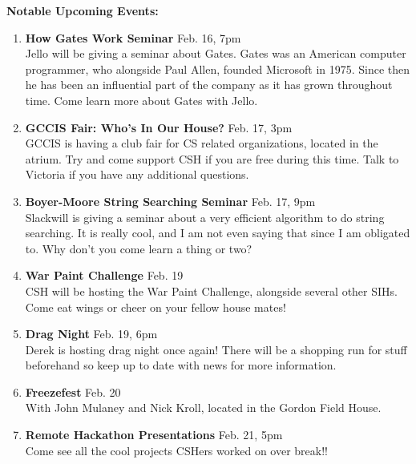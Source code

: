 \documentclass[9pt]{extarticle} %
\begin{document}
\begin{minipage}[t]{.44\linewidth}
\begin{mdframed}[style=sidebar,frametitle={}]
\textbf{Notable Upcoming Events:}
\begin{enumerate}[leftmargin=0.2cm]
\item \textbf{How Gates Work Seminar} Feb. 16, 7pm \\
	Jello will be giving a seminar about Gates. Gates was an American computer programmer, who alongside Paul Allen, founded Microsoft in 1975. Since then he has been an influential part of the company as it has grown throughout time. Come learn more about Gates with Jello.
\\
\item \textbf{GCCIS Fair: Who's In Our House?} Feb. 17, 3pm \\
	GCCIS is having a club fair for CS related organizations, located in the atrium. Try and come support CSH if you are free during this time. Talk to Victoria if you have any additional questions.
\\
\item \textbf{Boyer-Moore String Searching Seminar} Feb. 17, 9pm \\
	Slackwill is giving a seminar about a very efficient algorithm to do string searching. It is really cool, and I am not even saying that since I am obligated to. Why don't you come learn a thing or two?
\\
\item \textbf{War Paint Challenge} Feb. 19 \\
	CSH will be hosting the War Paint Challenge, alongside several other SIHs. Come eat wings or cheer on your fellow house mates!
\\
\item \textbf{Drag Night} Feb. 19, 6pm \\
	Derek is hosting drag night once again! There will be a shopping run for stuff beforehand so keep up to date with news for more information.
\\
\item \textbf{Freezefest} Feb. 20 \\
	With John Mulaney and Nick Kroll, located in the Gordon Field House.
\\
\item \textbf{Remote Hackathon Presentations} Feb. 21, 5pm \\
	Come see all the cool projects CSHers worked on over break!!
\end{enumerate}




\end{mdframed}
\end{minipage}
\end{document}
